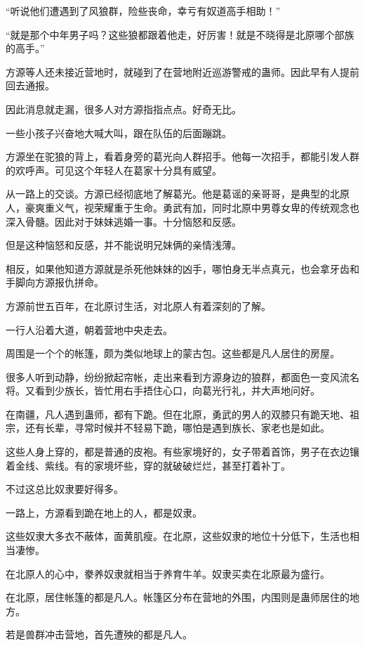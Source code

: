 \begin{this_body}
“听说他们遭遇到了风狼群，险些丧命，幸亏有奴道高手相助！”

“就是那个中年男子吗？这些狼都跟着他走，好厉害！就是不晓得是北原哪个部族的高手。”

方源等人还未接近营地时，就碰到了在营地附近巡游警戒的蛊师。因此早有人提前回去通报。

因此消息就走漏，很多人对方源指指点点。好奇无比。

一些小孩子兴奋地大喊大叫，跟在队伍的后面蹦跳。

方源坐在驼狼的背上，看着身旁的葛光向人群招手。他每一次招手，都能引发人群的欢呼声。可见这个年轻人在葛家十分具有威望。

从一路上的交谈。方源已经彻底地了解葛光。他是葛谣的亲哥哥，是典型的北原人，豪爽重义气，视荣耀重于生命。勇武有加，同时北原中男尊女卑的传统观念也深入骨髓。因此对于妹妹逃婚一事。十分恼怒和反感。

但是这种恼怒和反感，并不能说明兄妹俩的亲情浅薄。

相反，如果他知道方源就是杀死他妹妹的凶手，哪怕身无半点真元，也会拿牙齿和手脚向方源报仇拼命。

方源前世五百年，在北原讨生活，对北原人有着深刻的了解。

一行人沿着大道，朝着营地中央走去。

周围是一个个的帐篷，颇为类似地球上的蒙古包。这些都是凡人居住的房屋。

很多人听到动静，纷纷掀起帘帐，走出来看到方源身边的狼群，都面色一变风流名将。又看到少族长，皆忙用右手捂住心口，向葛光行礼，并大声地问好。

在南疆，凡人遇到蛊师，都有下跪。但在北原，勇武的男人的双膝只有跪天地、祖宗，还有长辈，寻常时候并不轻易下跪，哪怕是遇到族长、家老也是如此。

这些人身上穿的，都是普通的皮袍。有些家境好的，女子带着首饰，男子在衣边镶着金线、紫线。有的家境坏些，穿的就破破烂烂，甚至打着补丁。

不过这总比奴隶要好得多。

一路上，方源看到跪在地上的人，都是奴隶。

这些奴隶大多衣不蔽体，面黄肌瘦。在北原，这些奴隶的地位十分低下，生活也相当凄惨。

在北原人的心中，豢养奴隶就相当于养育牛羊。奴隶买卖在北原最为盛行。

在北原，居住帐篷的都是凡人。帐篷区分布在营地的外围，内围则是蛊师居住的地方。

若是兽群冲击营地，首先遭殃的都是凡人。


\end{this_body}
